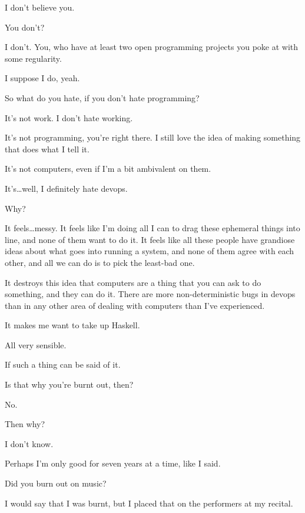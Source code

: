 \begin{paracol}{2}
\begin{leftcolumn}
\begin{ally}
I don't believe you.
\end{ally}
You don't?

\begin{ally}
I don't. You, who have at least two open programming projects you poke at with some regularity.
\end{ally}
I suppose I do, yeah.

\begin{ally}
So what do you hate, if you don't hate programming?
\end{ally}
It's not work. I don't hate working.

It's not programming, you're right there. I still love the idea of making something that does what I tell it.

It's not computers, even if I'm a bit ambivalent on them.

It's\ldots{}well, I definitely hate devops.

\begin{ally}
Why?
\end{ally}
It feels\ldots{}messy. It feels like I'm doing all I can to drag these ephemeral things into line, and none of them want to do it. It feels like all these people have grandiose ideas about what goes into running a system, and none of them agree with each other, and all we can do is to pick the least-bad one.

It destroys this idea that computers are a thing that you can ask to do something, and they can do it. There are more non-deterministic bugs in devops than in any other area of dealing with computers than I've experienced.

It makes me want to take up Haskell.

\begin{ally}
All very sensible.
\end{ally}
If such a thing can be said of it.

\begin{ally}
Is that why you're burnt out, then?
\end{ally}
No.

\begin{ally}
Then why?
\end{ally}
I don't know.

Perhaps I'm only good for seven years at a time, like I said.

\begin{ally}
Did you burn out on music?
\end{ally}
I would say that I was burnt, but I placed that on the performers at my recital.


\end{leftcolumn}
\end{paracol}
